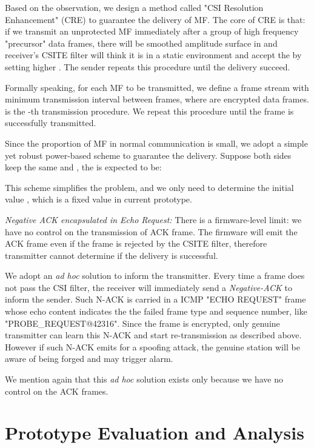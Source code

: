 \documentclass[conference]{IEEEtran}
\begin{document}
Based on the observation, we design a method called "CSI Resolution Enhancement" (CRE)
to guarantee the delivery of MF. The core of CRE is that:
if we transmit an unprotected
MF  immediately after a group of high frequency
"precursor" data frames,
there will be smoothed amplitude surface in 
and receiver's CSITE filter will think
it is in a static environment and accept the  by setting higher .
The sender repeats this procedure until the delivery succeed.

Formally speaking, for each MF  to be transmitted,
we define a frame stream
  with minimum
 transmission interval between frames, where  are encrypted data frames.
  is the -th transmission procedure.
 We repeat this procedure until the frame  is successfully transmitted.


Since the proportion of MF in normal communication is small,
we adopt a simple yet robust power-based scheme to guarantee the delivery. Suppose
both sides keep the same  and , the  is expected to be:

This scheme simplifies the problem, and we only need to determine the
initial value , which  is a fixed value in current prototype.



\textit{Negative ACK encapsulated in Echo Request:} There is a
firmware-level limit: we have no control on the transmission of
ACK frame. The firmware will emit the ACK frame even if the frame is rejected by the CSITE filter,
therefore transmitter cannot determine if the delivery is successful.

We adopt an \textit{ad hoc} solution to inform the transmitter. Every time
a frame does not pass the CSI filter, the receiver will immediately send
a \textit{Negative-ACK} to inform the sender. Such N-ACK is carried in a
ICMP "ECHO REQUEST" frame whose echo content indicates the
the failed frame type and
sequence number, like
"PROBE\_REQUEST@42316". Since the frame is encrypted, only genuine
transmitter can learn this N-ACK and start
re-transmission as described above. However if such N-ACK emits
for a spoofing attack, the genuine station will be aware of being
forged and may trigger alarm.

We mention again that this \textit{ad hoc} solution exists
only because we have no control on the ACK frames.

\section{Prototype Evaluation and Analysis}
\label{sec:evaluation}
\end{document}

